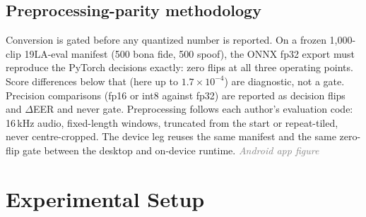 \documentclass[journal]{IEEEtran}
\newcommand{\placeholder}[1]{\textcolor{gray}{\emph{#1}}}
\begin{document}
\subsection{Preprocessing-parity methodology}
Conversion is gated before any quantized number is reported. On a frozen
1,000-clip 19LA-eval manifest (500 bona fide, 500 spoof), the ONNX fp32 export
must reproduce the PyTorch decisions exactly: zero flips at all three operating
points. Score differences below that (here up to \(1.7{\times}10^{-4}\)) are
diagnostic, not a gate. Precision comparisons (fp16 or int8 against fp32) are
reported as decision flips and \(\Delta\)EER and never gate. Preprocessing
follows each author's evaluation code: 16\,kHz audio, fixed-length windows,
truncated from the start or repeat-tiled, never centre-cropped. The device
leg reuses the same manifest and the same zero-flip gate between the desktop
and on-device runtime.
\placeholder{Android app figure}

\section{Experimental Setup}
\label{sec:setup}
\end{document}
